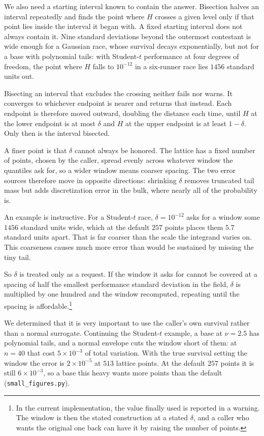 \documentclass[11pt]{article}
\begin{document}
We also need a starting interval known to contain the answer. Bisection
halves an interval repeatedly and finds the point where $H$ crosses a
given level only if that point lies inside the interval it began with. A
fixed starting interval does not always contain it. Nine standard
deviations beyond the outermost contestant is wide enough for a Gaussian
race, whose survival decays exponentially, but not for a base with
polynomial tails: with Student-$t$ performance at four degrees of
freedom, the point where $H$ falls to $10^{-12}$ in a six-runner race lies $1456$ standard
units out.

Bisecting an interval that excludes the crossing neither fails nor warns.
It converges to whichever endpoint is nearer and returns that instead.
Each endpoint is therefore moved outward, doubling the distance each
time, until $H$ at the lower endpoint is at most $\delta$ and $H$ at the
upper endpoint is at least $1-\delta$. Only then is the interval
bisected.

A finer point is that $\delta$ cannot always be honored. The
lattice has a fixed number of points, chosen by the caller, spread evenly
across whatever window the quantiles ask for, so a wider window means
coarser spacing. The two error sources therefore move in opposite
directions: shrinking $\delta$ removes truncated tail mass but adds
discretization error in the bulk, where nearly all of the probability is.

An example is instructive. For a Student-$t$ race, $\delta=10^{-12}$ asks for a window some
$1456$ standard units wide, which at the default $257$ points places them
$5.7$ standard units apart. That is far coarser than the scale the
integrand varies on. This coarseness causes much more error than would be sustained by missing the tiny tail.

So $\delta$ is treated only as a request. If the window it asks for cannot be
covered at a spacing of half the smallest performance standard deviation
in the field, $\delta$ is multiplied by one hundred and the window
recomputed, repeating until the spacing is affordable.\footnote{In the
current implementation, the value finally used is reported in a warning.
The window is then the stated construction at a stated $\delta$, and a
caller who wants the original one back can have it by raising the number
of points.}

We determined that it is very important to use the caller's own
survival rather than a normal surrogate. Continuing the Student-$t$
example, a base at $\nu=2.5$ has polynomial tails, and a normal envelope
cuts the window short of them: at $n=40$ that cost
$5\times10^{-3}$ of total variation. With the true survival setting the
window the error is $2\times10^{-5}$ at $513$ lattice points. At the
default $257$ points it is still $6\times10^{-3}$, so a base this heavy
wants more points than the default (\texttt{small\_figures.py}).
\end{document}
